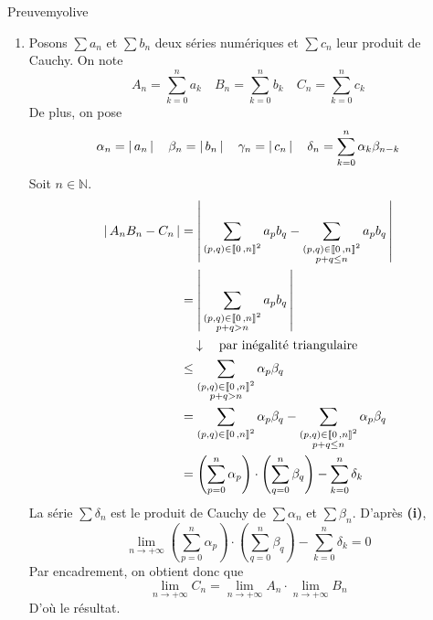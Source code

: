 \begin{demo}{Preuve}{myolive}
\begin{enumerate}
                On sait que $(A_n)$ et $(B_n)$ sont majorées car convergent et sont à termes positifs. Avec $(1)$, on obtient que $(C_n)$ est majorée d’où $\sum c_n$ converge. De plus, $C_n \leq A_n B_n \leq C_{2n}$, donc 
                \[ \lim_{n \rightarrow +\infty} C_n = \lim_{n \rightarrow +\infty} A_n \cdot \lim_{n \rightarrow +\infty} B_n \] ce qui nous donne le résultat.
                \item Posons $\sum a_n$ et $\sum b_n$ deux séries numériques et $\sum c_n$ leur produit de Cauchy. On note
                \[ A_n = \sum_{k=0}^{n} a_k \quad B_n = \sum_{k=0}^{n} b_k \quad C_n = \sum_{k=0}^{n} c_k \]  
                De plus, on pose 
                \[ \alpha_n = \left\lvert \,a_n \, \right\rvert \quad \beta_n = \left\lvert \,b_n \, \right\rvert \quad \gamma_n = \left\lvert \,c_n \, \right\rvert \quad \delta_n = \sum_{k=0}^{n} \alpha_k \beta_{n-k} \]
                Soit $n \in \mathbb{N}$. 
                \begin{align*}
                    \left\lvert \,A_n B_n - C_n \, \right\rvert 
                    &= \left\lvert \,\sum_{(p,q) \in \left\llbracket 0 \, , n \right\rrbracket^2} a_p b_q - \sum_{\substack{(p,q) \in \left\llbracket 0 \, , n \right\rrbracket^2 \\ p+q \leq n}} a_p b_q \, \right\rvert \\
                    &= \left\lvert \,\sum_{\substack{(p,q) \in \left\llbracket 0 \, , n \right\rrbracket^2 \\ p+q > n}} a_p b_q \, \right\rvert \\
                    & \quad \downarrow \quad \text{par inégalité triangulaire} \\
                    &\leq \sum_{\substack{(p,q) \in \left\llbracket 0 \, , n \right\rrbracket^2 \\ p+q > n}} \alpha_p \beta_q \\
                    &= \sum_{(p,q) \in \left\llbracket 0 \, , n \right\rrbracket^2} \alpha_p \beta_q - \sum_{\substack{(p,q) \in \left\llbracket 0 \, , n \right\rrbracket^2 \\ p+q \leq n}} \alpha_p \beta_q \\
                    &= \left(\sum_{p=0}^{n} \alpha_p\right) \cdot \left(\sum_{q=0}^{n} \beta_q\right) - \sum_{k=0}^{n} \delta_k 
                \end{align*}
                La série $\sum \delta_n$ est le produit de Cauchy de $\sum \alpha_n$ et $\sum \beta_n$. D’après \textbf{(i)}, 
                \[ \lim_{n \rightarrow +\infty} \left(\sum_{p=0}^{n} \alpha_p\right) \cdot \left(\sum_{q=0}^{n} \beta_q\right) - \sum_{k=0}^{n} \delta_k  = 0 \] 
                Par encadrement, on obtient donc que 
                \[ \lim_{n \rightarrow +\infty} C_n = \lim_{n \rightarrow +\infty} A_n \cdot \lim_{n \rightarrow +\infty} B_n \]
                D’où le résultat.
            \end{enumerate}
        \end{demo}

